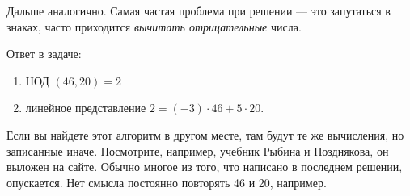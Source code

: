 \documentclass{article}
\begin{document}
    Дальше аналогично. Самая частая проблема при решении — это запутаться в знаках, часто приходится {\em вычитать отрицательные} числа.

    Ответ в задаче:
    \begin{enumerate}
        \item НОД $(46,20) = 2$
        \item линейное представление $2 = (-3)\cdot46+5\cdot20$.
    \end{enumerate}

    Если вы найдете этот алгоритм в другом месте, там будут те же вычисления, но записанные иначе. Посмотрите, например, учебник Рыбина и Позднякова, он выложен на сайте. Обычно многое из того, что написано в последнем решении, опускается. Нет смысла постоянно повторять 46 и 20, например.
\end{document}
